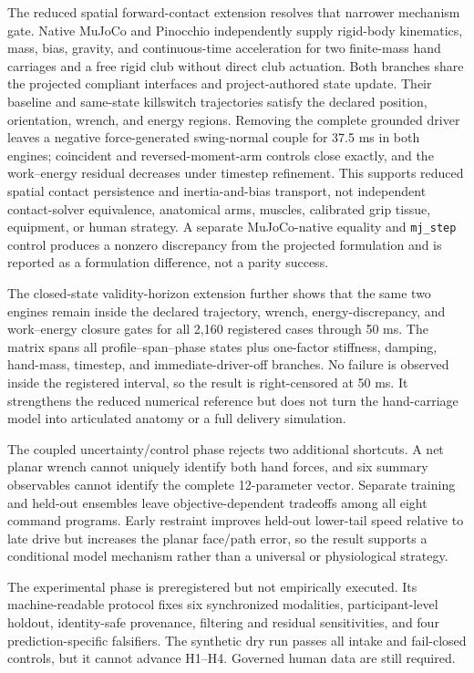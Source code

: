 \documentclass[
  letterpaper,
]{report}
\begin{document}
The reduced spatial forward-contact extension resolves that narrower
mechanism gate. Native MuJoCo and Pinocchio independently supply
rigid-body kinematics, mass, bias, gravity, and continuous-time
acceleration for two finite-mass hand carriages and a free rigid club
without direct club actuation. Both branches share the projected
compliant interfaces and project-authored state update. Their baseline
and same-state killswitch trajectories satisfy the declared position,
orientation, wrench, and energy regions. Removing the complete grounded
driver leaves a negative force-generated swing-normal couple for 37.5 ms
in both engines; coincident and reversed-moment-arm controls close
exactly, and the work--energy residual decreases under timestep
refinement. This supports reduced spatial contact persistence and
inertia-and-bias transport, not independent contact-solver equivalence,
anatomical arms, muscles, calibrated grip tissue, equipment, or human
strategy. A separate MuJoCo-native equality and \texttt{mj\_step}
control produces a nonzero discrepancy from the projected formulation
and is reported as a formulation difference, not a parity success.

The closed-state validity-horizon extension further shows that the same
two engines remain inside the declared trajectory, wrench,
energy-discrepancy, and work--energy closure gates for all 2,160
registered cases through 50 ms. The matrix spans all
profile--span--phase states plus one-factor stiffness, damping,
hand-mass, timestep, and immediate-driver-off branches. No failure is
observed inside the registered interval, so the result is right-censored
at 50 ms. It strengthens the reduced numerical reference but does not
turn the hand-carriage model into articulated anatomy or a full delivery
simulation.

The coupled uncertainty/control phase rejects two additional shortcuts.
A net planar wrench cannot uniquely identify both hand forces, and six
summary observables cannot identify the complete 12-parameter vector.
Separate training and held-out ensembles leave objective-dependent
tradeoffs among all eight command programs. Early restraint improves
held-out lower-tail speed relative to late drive but increases the
planar face/path error, so the result supports a conditional model
mechanism rather than a universal or physiological strategy.

The experimental phase is preregistered but not empirically executed.
Its machine-readable protocol fixes six synchronized modalities,
participant-level holdout, identity-safe provenance, filtering and
residual sensitivities, and four prediction-specific falsifiers. The
synthetic dry run passes all intake and fail-closed controls, but it
cannot advance H1--H4. Governed human data are still required.
\end{document}
